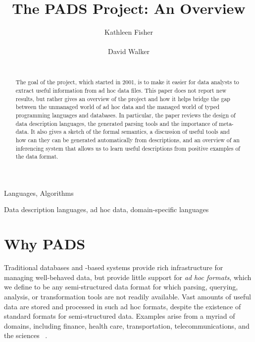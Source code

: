 \documentclass{sig-alternate}
\begin{document}
\title{The PADS Project: An Overview}
\author{
\alignauthor
Kathleen Fisher\\
  \\
\alignauthor
David Walker\\
  \\
  }



\maketitle{}

\begin{abstract}  
  The goal of the \pads{} project, which started in 2001, is to make
  it easier for data analysts to extract useful information from ad
  hoc data files.  This paper does not report new results, but rather
  gives an overview of the project
  and how it helps bridge
the gap between the unmanaged world of ad hoc data and
the managed world of typed programming languages and
databases.
  In particular, the paper reviews the design of \pads{}
  data description languages, the generated parsing
  tools and the importance of meta-data.  It also gives a sketch of the formal
  semantics, a discussion of useful tools and how can they can be
  generated automatically from \pads{} descriptions, and an overview
  of an inferencing system that allows us to learn useful \pads{}
  descriptions from positive examples of the data format.
\end{abstract}


\terms
Languages, Algorithms

\keywords
Data description languages, ad hoc data,  domain-specific languages


\section {Why PADS}
\label{sec:intro}

Traditional databases and \xml{}-based systems provide rich
infrastructure for managing well-behaved data, but provide little
support for \textit{ad hoc formats}, which we define to be any
semi-structured data format for which parsing, querying, analysis, or
transformation tools are not readily available.  Vast amounts of
useful data are stored and processed in such ad hoc formats, despite
the existence of standard formats for semi-structured data.  Examples
arise from a myriad of domains, including finance, health care,
transportation, telecommunications, and the sciences ~\cite{fisher+:pads}. 
\end{document}
